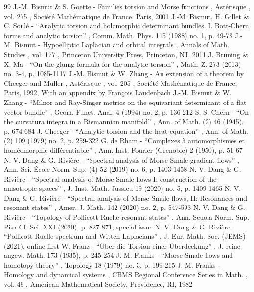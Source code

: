 \documentclass[11pt]{article}
\numberwithin{equation}{section}
\theoremstyle{plain}
\theoremstyle{definition}
\theoremstyle{remark}
\begin{document}
\begin{thebibliography}{99}
 J.-M. Bismut \& S. Goette - Families torsion and Morse functions , Astérisque , vol. 275 , Société Mathématique de France, Paris, 2001
 J.-M. Bismut, H. Gillet \& C. Soulé - “Analytic torsion and holomorphic determinant bundles. I. Bott-Chern forms and analytic torsion” , Comm. Math. Phys. 115 (1988) no. 1, p. 49-78
 J.-M. Bismut - Hypoelliptic Laplacian and orbital integrals , Annals of Math. Studies , vol. 177 , Princeton University Press, Princeton, NJ, 2011
 J. Brüning \& X. Ma - “On the gluing formula for the analytic torsion” , Math. Z. 273 (2013) no. 3-4, p. 1085-1117
 J.-M. Bismut \& W. Zhang - An extension of a theorem by Cheeger and Müller , Astérisque , vol. 205 , Société Mathématique de France, Paris, 1992, With an appendix by François Laudenbach
 J.-M. Bismut \& W. Zhang - “Milnor and Ray-Singer metrics on the equivariant determinant of a flat vector bundle” , Geom. Funct. Anal. 4 (1994) no. 2, p. 136-212
 S. S. Chern - “On the curvatura integra in a Riemannian manifold” , Ann. of Math. (2) 46 (1945), p. 674-684
 J. Cheeger - “Analytic torsion and the heat equation” , Ann. of Math. (2) 109 (1979) no. 2, p. 259-322
 G. de Rham - “Complexes à automorphismes et homéomorphie différentiable” , Ann. Inst. Fourier (Grenoble) 2 (1950), p. 51-67
 N. V. Dang \& G. Rivière - “Spectral analysis of Morse-Smale gradient flows” , Ann. Sci. École Norm. Sup. (4) 52 (2019) no. 6, p. 1403-1458
 N. V. Dang \& G. Rivière - “Spectral analysis of Morse-Smale flows I: construction of the anisotropic spaces” , J. Inst. Math. Jussieu 19 (2020) no. 5, p. 1409-1465
 N. V. Dang \& G. Rivière - “Spectral analysis of Morse-Smale flows, II: Resonances and resonant states” , Amer. J. Math. 142 (2020) no. 2, p. 547-593
 N. V. Dang \& G. Rivière - “Topology of Pollicott-Ruelle resonant states” , Ann. Scuola Norm. Sup. Pisa Cl. Sci. XXI (2020), p. 827-871, special issue
 N. V. Dang \& G. Rivière - “Pollicott-Ruelle spectrum and Witten Laplacians” , J. Eur. Math. Soc. (JEMS) (2021), online first
 W. Franz - “Über die Torsion einer Überdeckung” , J. reine angew. Math. 173 (1935), p. 245-254
 J. M. Franks - “Morse-Smale flows and homotopy theory” , Topology 18 (1979) no. 3, p. 199-215
 J. M. Franks - Homology and dynamical systems , CBMS Regional Conference Series in Math. , vol. 49 , American Mathematical Society, Providence, RI, 1982

\end{thebibliography}
\end{document}
